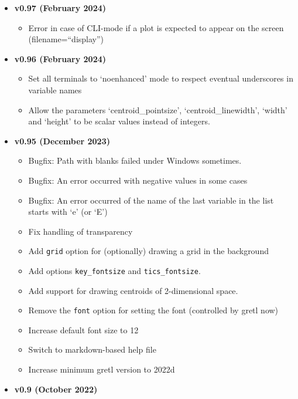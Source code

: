 \documentclass{article}
\newcommand{\tightlist}{}
\begin{document}
\begin{itemize}
  \begin{itemize}
  \tightlist
  \item
    Make width, height, font size and point size a function of the
    number of variables for better readability in case of many
    variables.
  \item
    Set parameter \texttt{transparency} per default to 90.
  \item
    Minor update of the sample script
  \end{itemize}
\item
  \textbf{v0.97 (February 2024)}

  \begin{itemize}
  \tightlist
  \item
    Error in case of CLI-mode if a plot is expected to appear on the
    screen (filename=``display'')
  \end{itemize}
\item
  \textbf{v0.96 (February 2024)}

  \begin{itemize}
  \tightlist
  \item
    Set all terminals to `noenhanced' mode to respect eventual
    underscores in variable names
  \item
    Allow the parameters `centroid\_pointsize', `centroid\_linewidth',
    `width' and `height' to be scalar values instead of integers.
  \end{itemize}
\item
  \textbf{v0.95 (December 2023)}

  \begin{itemize}
  \tightlist
  \item
    Bugfix: Path with blanks failed under Windows sometimes.
  \item
    Bugfix: An error occurred with negative values in some cases
  \item
    Bugfix: An error occurred of the name of the last variable in the
    list starts with `e' (or `E')
  \item
    Fix handling of transparency
  \item
    Add \texttt{grid} option for (optionally) drawing a grid in the
    background
  \item
    Add options \texttt{key\_fontsize} and \texttt{tics\_fontsize}.
  \item
    Add support for drawing centroids of 2-dimensional space.
  \item
    Remove the \texttt{font} option for setting the font (controlled by
    gretl now)
  \item
    Increase default font size to 12
  \item
    Switch to markdown-based help file
  \item
    Increase minimum gretl version to 2022d
  \end{itemize}
\item
  \textbf{v0.9 (October 2022)}


\end{itemize}
\end{document}
